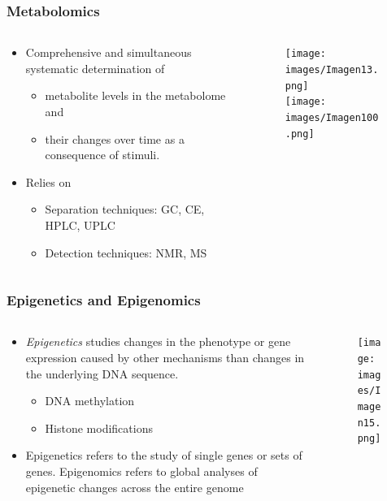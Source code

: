 \documentclass{beamer}
\begin{document}
 
 \begin{frame}
 	\frametitle{Metabolomics}
 	\begin{columns}%
 		\begin{column}[t]{0.45\textwidth}%
 			\begin{itemize}
 				\item Comprehensive and simultaneous systematic determination of
 				\begin{itemize}
 					\item metabolite levels in the metabolome and 
 					\item their changes over time as a consequence of stimuli.
 				\end{itemize}
 				\item Relies on
 				\begin{itemize}
 					\item Separation techniques: GC, CE, HPLC, UPLC
 					\item Detection techniques: NMR, MS
 				\end{itemize}
 			\end{itemize}
 		\end{column}
 		
 		\begin{column}[t]{0.45\textwidth}%
 			\begin{figure}[ht]
 				\centering
 				\texttt{[image: images/Imagen13.png]}\\
 				\texttt{[image: images/Imagen100.png]}
 			\end{figure} 
 		\end{column}
 	\end{columns}
 \end{frame}


 \begin{frame}
 	\frametitle{Epigenetics and Epigenomics}
 	\begin{columns}%
 		\begin{column}[t]{0.5\textwidth}%
 			{\small
 			\begin{itemize}
 				\item \textit{Epigenetics} studies changes in the phenotype or gene expression caused by other mechanisms than changes in the underlying DNA sequence.
 				\begin{itemize}
 					\item DNA methylation
 					\item Histone modifications
 				\end{itemize}
 				\item Epigenetics refers to the study of single genes or sets of genes. Epigenomics refers to global analyses of epigenetic changes across the entire genome
 			\end{itemize}
 		}
 		\end{column}
 		
 		\begin{column}[t]{0.4\textwidth}%
 			\begin{figure}[ht]
 				\centering
 				\texttt{[image: images/Imagen15.png]}
 			\end{figure} 
 		\end{column}
 	\end{columns}
 \end{frame} 
 
\end{document}
